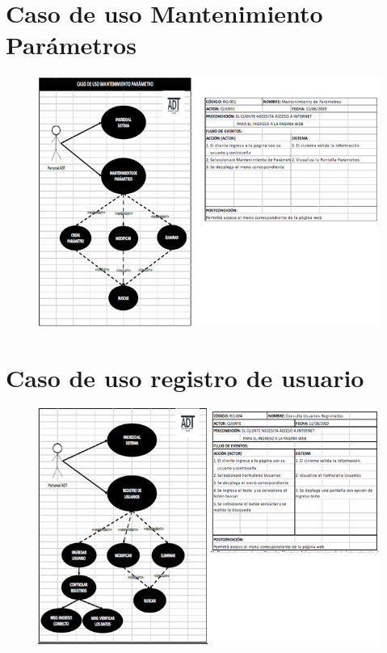 \documentclass[12pt,a4paper]{article}
\begin{document}
\section*{Caso de uso Mantenimiento Parámetros}
\begin{figure}[hbtp]
\caption{}
\centering
\includegraphics[scale=0.6]{SEXTA.png}
\end{figure}



\section*{Caso de uso registro de usuario}
\begin{figure}[hbtp]
\caption{}
\centering
\includegraphics[scale=0.6]{SEPTIMA.png}
\end{figure}
\end{document}
